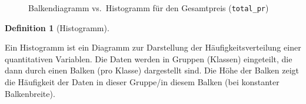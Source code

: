 \documentclass[
  letterpaper,
]{scrbook}
\theoremstyle{definition}
\theoremstyle{definition}
\theoremstyle{definition}
\newtheorem{definition}{Definition}[chapter]
\theoremstyle{remark}
\begin{document}
\begin{figure}

\begin{minipage}{0.50\linewidth}



\end{minipage}%
%
\begin{minipage}{0.50\linewidth}



\end{minipage}%

\caption{\label{fig-balken-hist}Balkendiagramm vs.~Histogramm für den
Gesamtpreis (\texttt{total\_pr})}

\end{figure}%

\begin{definition}[Histogramm]\protect\hypertarget{def-histogramm}{}\label{def-histogramm}

Ein Histogramm ist ein Diagramm zur Darstellung der
Häufigkeitsverteilung einer quantitativen Variablen. Die Daten werden in
Gruppen (Klassen) eingeteilt, die dann durch einen Balken (pro Klasse)
dargestellt sind. Die Höhe der Balken zeigt die Häufigkeit der Daten in
dieser Gruppe/in diesem Balken (bei konstanter Balkenbreite).

\end{definition}
\end{document}
